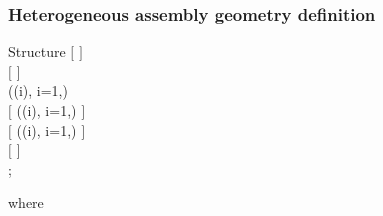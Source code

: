 \clearpage

\subsubsection{Heterogeneous assembly geometry definition}\label{sect:descnap3}

\begin{DataStructure}{Structure }
$[$   $]$ \\
  $[$  $]$  \\
  ((i), i=1,)  \\
$[$  ((i), i=1,) $]$ \\
$[$  ((i), i=1,) $]$ \\
$[$   $]$ \\
;
\end{DataStructure}

\noindent where

